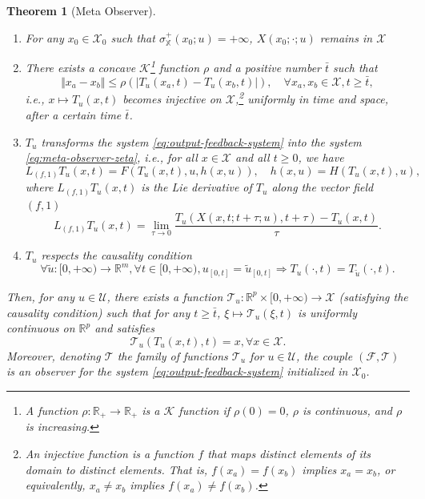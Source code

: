 \documentclass[
]{book}
\newtheorem{theorem}{Theorem}[chapter]
\theoremstyle{definition}
\theoremstyle{definition}
\theoremstyle{definition}
\theoremstyle{definition}
\theoremstyle{remark}
\begin{document}
\begin{theorem}[Meta Observer]
\begin{enumerate}
\def\labelenumi{\arabic{enumi}.}
\item
  For any \(x_0 \in \mathcal{X}_0\) such that \(\sigma^+_{\mathbb{X}}(x_0;u) = + \infty\), \(X(x_0;\cdot;u)\) remains in \(\mathcal{X}\)
\item
  There exists a concave \(\mathcal{K}\)\footnote{A function \(\rho: \mathbb{R}_+ \rightarrow \mathbb{R}_+\) is a \(\mathcal{K}\) function if \(\rho(0) = 0\), \(\rho\) is continuous, and \(\rho\) is increasing.} function \(\rho\) and a positive number \(\bar{t}\) such that
  \[
  \Vert x_a - x_b \Vert \leq \rho (| T_u(x_a,t) - T_u(x_b,t) |), \quad \forall x_a,x_b \in \mathcal{X}, t \geq \bar{t},
  \]
  i.e., \(x \mapsto T_u(x,t)\) becomes injective on \(\mathcal{X}\),\footnote{An injective function is a function \(f\) that maps distinct elements of its domain to distinct elements. That is, \(f(x_a) = f(x_b)\) implies \(x_a = x_b\), or equivalently, \(x_a \neq x_b\) implies \(f(x_a) \neq f(x_b)\).} uniformly in time and space, after a certain time \(\bar{t}\).
\item
  \(T_u\) transforms the system \eqref{eq:output-feedback-system} into the system \eqref{eq:meta-observer-zeta}, i.e., for all \(x \in \mathcal{X}\) and all \(t \geq 0\), we have
  \begin{equation}
  L_{(f,1)} T_u(x,t) = F(T_u(x,t),u,h(x,u)), \quad h(x,u) = H(T_u(x,t),u),
  \label{eq:meta-observer-transform}
  \end{equation}
  where \(L_{(f,1)} T_u(x,t)\) is the Lie derivative of \(T_u\) along the vector field \((f,1)\)
  \[
  L_{(f,1)} T_u(x,t) = \lim_{\tau \rightarrow 0} \frac{ T_u (X(x,t;t+\tau;u),t+\tau) - T_u(x,t) }{\tau}.
  \]
\item
  \(T_u\) respects the causality condition
  \[
  \forall \tilde{u}: [0,+\infty) \rightarrow \mathbb{R}^m, \forall t \in [0,+\infty), u_{[0,t]} = \tilde{u}_{[0,t]} \Rightarrow T_u(\cdot,t) = T_{\tilde{u}}(\cdot,t).
  \]
\end{enumerate}

Then, for any \(u \in \mathcal{U}\), there exists a function \(\mathcal{T}_u: \mathbb{R}^p \times [0,+\infty) \rightarrow \mathcal{X}\) (satisfying the causality condition) such that for any \(t \geq \bar{t}\), \(\xi \mapsto \mathcal{T}_u (\xi, t)\) is uniformly continuous on \(\mathbb{R}^p\) and satisfies
\[
\mathcal{T}_u \left( T_u(x,t),t \right) = x, \forall x \in \mathcal{X}.
\]
Moreover, denoting \(\mathcal{T}\) the family of functions \(\mathcal{T}_u\) for \(u \in \mathcal{U}\), the couple \((\mathcal{F}, \mathcal{T})\) is an observer for the system \eqref{eq:output-feedback-system} initialized in \(\mathcal{X}_0\).
\end{theorem}
\end{document}
